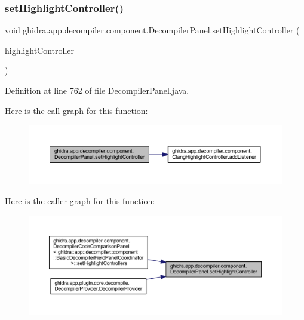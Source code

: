 \subsubsection{\texorpdfstring{setHighlightController()}{setHighlightController()}}
{\footnotesize\ttfamily void ghidra.\+app.\+decompiler.\+component.\+Decompiler\+Panel.\+set\+Highlight\+Controller (\begin{DoxyParamCaption}\item[{\mbox{\hyperlink{classghidra_1_1app_1_1decompiler_1_1component_1_1_clang_highlight_controller}{Clang\+Highlight\+Controller}}}]{highlight\+Controller }\end{DoxyParamCaption})\hspace{0.3cm}{\ttfamily [inline]}}



Definition at line 762 of file Decompiler\+Panel.\+java.

Here is the call graph for this function\+:
\nopagebreak
\begin{figure}[H]
\begin{center}
\leavevmode
\includegraphics[width=350pt]{classghidra_1_1app_1_1decompiler_1_1component_1_1_decompiler_panel_a5b356eadb37bd9994342354b8821d523_cgraph}
\end{center}
\end{figure}
Here is the caller graph for this function\+:
\nopagebreak
\begin{figure}[H]
\begin{center}
\leavevmode
\includegraphics[width=350pt]{classghidra_1_1app_1_1decompiler_1_1component_1_1_decompiler_panel_a5b356eadb37bd9994342354b8821d523_icgraph}
\end{center}
\end{figure}
\mbox{\label{classghidra_1_1app_1_1decompiler_1_1component_1_1_decompiler_panel_ad506e0f6404f530197c697471aad3594}} 
